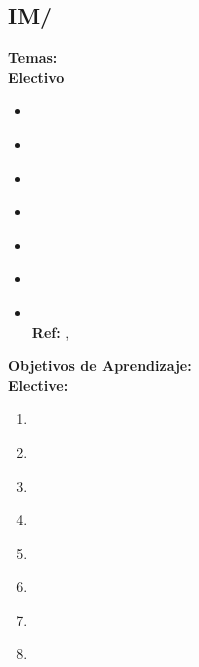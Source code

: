 \subsection{IM/\IMDataMining}\label{sec:BOK:IMDataMining}
\noindent \textbf{Temas:}\\
\noindent \textbf{Electivo}
\begin{itemize}
	\item \IMDataMiningTopicUses\label{sec:BOK:IMDataMiningTopicUses}
	\item \IMDataMiningTopicData\label{sec:BOK:IMDataMiningTopicData}
	\item \IMDataMiningTopicAssociative\label{sec:BOK:IMDataMiningTopicAssociative}
	\item \IMDataMiningTopicDataClustering\label{sec:BOK:IMDataMiningTopicDataClustering}
	\item \IMDataMiningTopicMarket\label{sec:BOK:IMDataMiningTopicMarket}
	\item \IMDataMiningTopicDataCleaning\label{sec:BOK:IMDataMiningTopicDataCleaning}
	\item \IMDataMiningTopicDataVisualization\xspace \\ \textbf{Ref:} , \label{sec:BOK:IMDataMiningTopicDataVisualization}
\end{itemize}


\noindent \textbf{Objetivos de Aprendizaje:}\\
\noindent \textbf{Elective:}
\begin{enumerate}
	\setcounter{enumi}{0}
	\item \IMDataMiningLOCompareAndUses\xspace[\IMDataMiningLOCompareAndUsesLevel]\label{sec:BOK:IMDataMiningLOCompareAndUses}
	\item \IMDataMiningLOExplainTheFinding\xspace[\IMDataMiningLOExplainTheFindingLevel]\label{sec:BOK:IMDataMiningLOExplainTheFinding}
	\item \IMDataMiningLOCharacterizeThe\xspace[\IMDataMiningLOCharacterizeTheLevel]\label{sec:BOK:IMDataMiningLOCharacterizeThe}
	\item \IMDataMiningLODescribeHowA\xspace[\IMDataMiningLODescribeHowALevel]\label{sec:BOK:IMDataMiningLODescribeHowA}
	\item \IMDataMiningLOEvaluateDifferent\xspace[\IMDataMiningLOEvaluateDifferentLevel]\label{sec:BOK:IMDataMiningLOEvaluateDifferent}
	\item \IMDataMiningLOIdentifyAnd\xspace[\IMDataMiningLOIdentifyAndLevel]\label{sec:BOK:IMDataMiningLOIdentifyAnd}
	\item \IMDataMiningLOIdentifyMechanisms\xspace[\IMDataMiningLOIdentifyMechanismsLevel]\label{sec:BOK:IMDataMiningLOIdentifyMechanisms}
	\item \IMDataMiningLODescribeWhy\xspace[\IMDataMiningLODescribeWhyLevel]\label{sec:BOK:IMDataMiningLODescribeWhy}
\end{enumerate}


